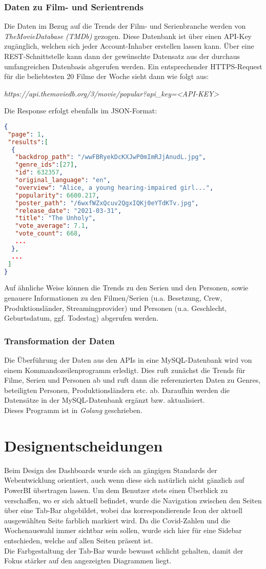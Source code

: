 \documentclass[12pt]{article}
\begin{document}
\section{Daten zu Film- und Serientrends}
Die Daten im Bezug auf die Trends der Film- und Serienbranche werden von \textit{TheMovieDatabase (TMDb)} gezogen. Diese Datenbank ist über einen API-Key zugänglich, welchen sich jeder Account-Inhaber erstellen lassen kann. Über eine REST-Schnittstelle kann dann der gewünschte Datensatz aus der durchaus umfangreichen Datenbasis abgerufen werden. Ein entsprechender HTTPS-Request für die beliebtesten 20 Filme der Woche sieht dann wie folgt aus:
\begin{center}
\textit{https://api.themoviedb.org/3/movie/popular?api\_{}key=<API-KEY>}
\end{center}
Die Response erfolgt ebenfalls im JSON-Format:
\begin{lstlisting}[language=json,firstnumber=1]
{
 "page": 1,
 "results":[
  {
   "backdrop_path": "/wwFBRyekDcKXJwP0mImRJjAnudL.jpg",
   "genre_ids":[27],
   "id": 632357,
   "original_language": "en",
   "overview": "Alice, a young hearing-impaired girl...",
   "popularity": 6600.217,
   "poster_path": "/6wxfWZxQcuv2QgxIQKj0eYTdKTv.jpg",
   "release_date": "2021-03-31",
   "title": "The Unholy",
   "vote_average": 7.1,
   "vote_count": 668,
   ...
  },
  ...
 ]
}
\end{lstlisting}
Auf ähnliche Weise können die Trends zu den Serien und den Personen, sowie genauere Informationen zu den Filmen/Serien (u.a. Besetzung, Crew, Produktionsländer, Streamingprovider) und Personen (u.a. Geschlecht, Geburtsdatum, ggf. Todestag) abgerufen werden.
\section{Transformation der Daten}
Die Überführung der Daten aus den APIs in eine MySQL-Datenbank wird von einem Kommandozeilenprogramm erledigt. Dies ruft zunächst die Trends für Filme, Serien und Personen ab und ruft dann die referenzierten Daten zu Genres, beteiligten Personen, Produktionsländern etc. ab. Daraufhin werden die Datensätze in der MySQL-Datenbank ergänzt bzw. aktualisiert.\\
Dieses Programm ist in \textit{Golang} geschrieben.

\part{Designentscheidungen}
Beim Design des Dashboards wurde sich an gängigen Standards der Webentwicklung orientiert, auch wenn diese sich natürlich nicht gänzlich auf PowerBI übertragen lassen. Um dem Benutzer stets einen Überblick zu verschaffen, wo er sich aktuell befindet, wurde die Navigation zwischen den Seiten über eine Tab-Bar abgebildet, wobei das korrespondierende Icon der aktuell ausgewählten Seite farblich markiert wird. Da die Covid-Zahlen und die Wochenauswahl immer sichtbar sein sollen, wurde sich hier für eine Sidebar entschieden, welche auf allen Seiten präsent ist.\\
Die Farbgestaltung der Tab-Bar wurde bewusst schlicht gehalten, damit der Fokus stärker auf den angezeigten Diagrammen liegt.
\end{document}
